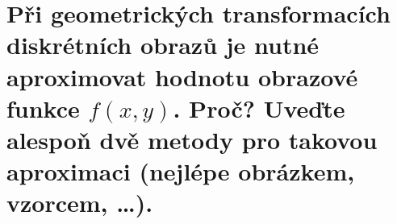 \section{Při geometrických transformacích diskrétních obrazů je nutné aproximovat hodnotu obrazové funkce $f(x,y)$. 
Proč? Uveďte alespoň dvě metody pro takovou aproximaci (nejlépe obrázkem, vzorcem, \dots).}